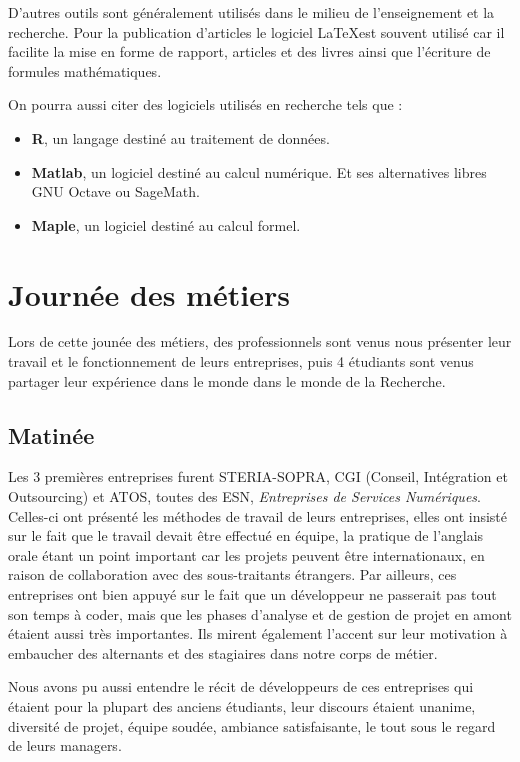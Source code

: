 \documentclass[12pt, a4paper]{report}
\begin{document}
  D'autres outils sont généralement utilisés dans le milieu de l'enseignement et la recherche. Pour la publication d'articles le logiciel \LaTeX est souvent utilisé car il facilite la mise en forme de rapport, articles et des livres ainsi que l'écriture de formules mathématiques.

  On pourra aussi citer des logiciels utilisés en recherche tels que :
  \begin{itemize}
  	\item \textbf{R}, un langage destiné au traitement de données.
  	\item \textbf{Matlab}, un logiciel destiné au calcul numérique. Et ses alternatives libres GNU Octave ou SageMath.
  	\item \textbf{Maple}, un logiciel destiné au calcul formel.
  \end{itemize}

\chapter{Journée des métiers}

Lors de cette jounée des métiers, des professionnels sont venus nous présenter leur travail et le fonctionnement de leurs entreprises, puis 4 étudiants sont venus partager leur expérience dans le monde dans le monde de la Recherche.

\section{Matinée}

Les 3 premières entreprises furent STERIA-SOPRA, CGI (Conseil, Intégration et Outsourcing) et ATOS, toutes des ESN, \emph{Entreprises de Services Numériques}. Celles-ci ont présenté les méthodes de travail de leurs entreprises, elles ont insisté sur le fait que le travail devait être effectué en équipe, la pratique de l'anglais orale étant un point important car les projets peuvent être internationaux, en raison de collaboration avec des sous-traitants étrangers. Par ailleurs, ces entreprises ont bien appuyé sur le fait que un développeur ne passerait pas tout son temps à coder, mais que les phases d'analyse et de gestion de projet en amont étaient aussi très importantes. Ils mirent également l'accent sur leur motivation à embaucher des alternants et des stagiaires dans notre corps de métier.

Nous avons pu aussi entendre le récit de développeurs de ces entreprises qui étaient pour la plupart des anciens étudiants, leur discours étaient unanime, diversité de projet, équipe soudée, ambiance satisfaisante, le tout sous le regard de leurs managers.
\end{document}
